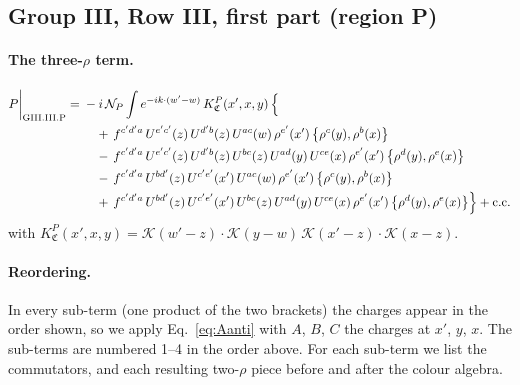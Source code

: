 \documentclass[10pt]{article}
\numberwithin{equation}{section}
\newcommand{\KK}{\mathcal K}
\newcommand{\NP}{\mathcal N_{P}}
\begin{document}
\subsection{Group III, Row III, first part (region P)}\label{sec:GIII.III.P}

\paragraph{The three-$\rho$ term.}
\begin{align}
P\bigg|_{\rm GIII.III.P}={}&-i\,\NP\int e^{-ik\cdot(w'-w)}\,K^{P}_{\mathfrak C}(x',x,y)\,\Big\{\notag\\
&\quad +\,f^{c'd'a}\,U^{e'c'}(z)\,U^{d'b}(z)\,U^{ac}(w)\,\rho^{e'}(x')\,\big\{\rho^{c}(y),\rho^{b}(x)\big\}\notag\\
&\quad -\,f^{c'd'a}\,U^{e'c'}(z)\,U^{d'b}(z)\,U^{bc}(z)\,U^{ad}(y)\,U^{ce}(x)\,\rho^{e'}(x')\,\big\{\rho^{d}(y),\rho^{e}(x)\big\}\notag\\
&\quad -\,f^{c'd'a}\,U^{bd'}(z)\,U^{c'e'}(x')\,U^{ac}(w)\,\rho^{e'}(x')\,\big\{\rho^{c}(y),\rho^{b}(x)\big\}\notag\\
&\quad +\,f^{c'd'a}\,U^{bd'}(z)\,U^{c'e'}(x')\,U^{bc}(z)\,U^{ad}(y)\,U^{ce}(x)\,\rho^{e'}(x')\,\big\{\rho^{d}(y),\rho^{e}(x)\big\}\Big\}+{\rm c.c.}\label{eq:in-GIII.III.P}
\end{align}
with $K^{P}_{\mathfrak C}(x',x,y)=\KK(w'-z)\cdot\KK(y-w)\,\KK(x'-z)\cdot\KK(x-z)$.
\paragraph{Reordering.} In every sub-term (one product of the two brackets) the charges appear in the order shown, so we apply Eq.~\eqref{eq:Aanti} with $A$, $B$, $C$ the charges at $x'$, $y$, $x$. The sub-terms are numbered 1--4 in the order above. For each sub-term we list the commutators, and each resulting two-$\rho$ piece before and after the colour algebra.
\end{document}
